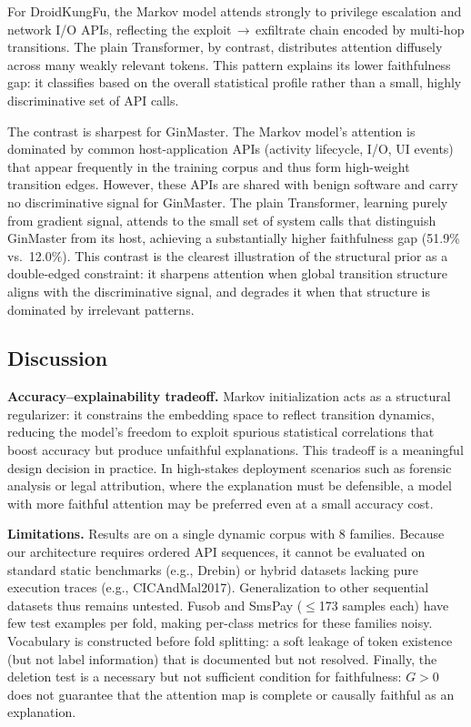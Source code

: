 \documentclass[12pt]{article}
\begin{document}
For DroidKungFu, the Markov model attends strongly to privilege
escalation and network I/O APIs, reflecting the exploit\,$\to$\,exfiltrate
chain encoded by multi-hop transitions. The plain Transformer, by
contrast, distributes attention diffusely across many weakly relevant
tokens. This pattern explains its lower faithfulness gap: it classifies
based on the overall statistical profile rather than a small, highly
discriminative set of API calls.

The contrast is sharpest for GinMaster. The Markov model's attention
is dominated by common host-application APIs (activity lifecycle,
I/O, UI events) that appear frequently in the training corpus and
thus form high-weight transition edges. However, these APIs are shared
with benign software and carry no discriminative signal for GinMaster.
The plain Transformer, learning purely from gradient signal, attends
to the small set of system calls that distinguish GinMaster from its
host, achieving a substantially higher faithfulness gap (51.9\%
vs.\ 12.0\%). This contrast is the clearest illustration of the
structural prior as a double-edged constraint: it sharpens attention
when global transition structure aligns with the discriminative signal,
and degrades it when that structure is dominated by irrelevant patterns.

\subsection{Discussion}

\textbf{Accuracy--explainability tradeoff.}
Markov initialization acts as a structural regularizer: it constrains
the embedding space to reflect transition dynamics, reducing the model's
freedom to exploit spurious statistical correlations that boost accuracy
but produce unfaithful explanations. This tradeoff is a meaningful
design decision in practice. In high-stakes deployment scenarios such
as forensic analysis or legal attribution, where the explanation must
be defensible, a model with more faithful attention may be preferred
even at a small accuracy cost.

\textbf{Limitations.}
Results are on a single dynamic corpus with 8 families. Because our architecture requires ordered API sequences, it cannot be evaluated on standard static benchmarks (e.g., Drebin) or hybrid datasets lacking pure execution traces (e.g., CICAndMal2017). Generalization to other sequential datasets thus remains untested.
Fusob and SmsPay ($\leq$173 samples each) have few test examples per
fold, making per-class metrics for these families noisy.
Vocabulary is constructed before fold splitting: a soft leakage of
token existence (but not label information) that is documented but
not resolved.
Finally, the deletion test is a necessary but not sufficient condition
for faithfulness: $G > 0$ does not guarantee that the attention map is
complete or causally faithful as an explanation.
\end{document}
